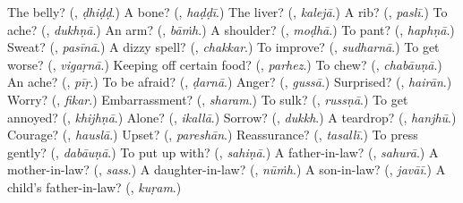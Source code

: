 \begin{tcolorbox}[breakable,colback=teal!4,colframe=teal!35!black,title={Before you move on}]
The belly? (\textbf{}, \emph{ḍhiḍḍ}.) A bone? (\textbf{}, \emph{haḍḍī}.) The liver? (\textbf{}, \emph{kalejā}.) A rib? (\textbf{}, \emph{paslī}.) To ache? (\textbf{}, \emph{dukhṇā}.) An arm? (\textbf{}, \emph{bāṁh}.) A shoulder? (\textbf{}, \emph{moḍhā}.) To pant? (\textbf{}, \emph{haphṇā}.) Sweat? (\textbf{}, \emph{pasīnā}.) A dizzy spell? (\textbf{}, \emph{chakkar}.) To improve? (\textbf{}, \emph{sudharnā}.) To get worse? (\textbf{}, \emph{vigaṛnā}.) Keeping off certain food? (\textbf{}, \emph{parhez}.) To chew? (\textbf{}, \emph{chabāuṇā}.) An ache? (\textbf{}, \emph{pīṛ}.) To be afraid? (\textbf{}, \emph{ḍarnā}.) Anger? (\textbf{}, \emph{gussā}.) Surprised? (\textbf{}, \emph{hairān}.) Worry? (\textbf{}, \emph{fikar}.) Embarrassment? (\textbf{}, \emph{sharam}.) To sulk? (\textbf{}, \emph{russṇā}.) To get annoyed? (\textbf{}, \emph{khijhṇā}.) Alone? (\textbf{}, \emph{ikallā}.) Sorrow? (\textbf{}, \emph{dukkh}.) A teardrop? (\textbf{}, \emph{hanjhū}.) Courage? (\textbf{}, \emph{hauslā}.) Upset? (\textbf{}, \emph{pareshān}.) Reassurance? (\textbf{}, \emph{tasallī}.) To press gently? (\textbf{}, \emph{dabāuṇā}.) To put up with? (\textbf{}, \emph{sahiṇā}.) A father-in-law? (\textbf{}, \emph{sahurā}.) A mother-in-law? (\textbf{}, \emph{sass}.) A daughter-in-law? (\textbf{}, \emph{nūṁh}.) A son-in-law? (\textbf{}, \emph{javāī}.) A child's father-in-law? (\textbf{}, \emph{kuṛam}.)
\end{tcolorbox}
